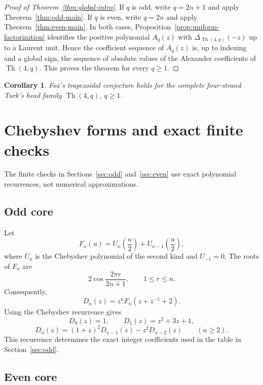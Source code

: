 \documentclass[11pt]{amsart}
\newtheorem{corollary}[theorem]{Corollary}
\newcommand{\Th}{\operatorname{Th}}
\begin{document}
\begin{proof}[Proof of Theorem~\ref{thm:global-intro}]
If \(q\) is odd, write \(q=2n+1\) and apply Theorem~\ref{thm:odd-main}.  If \(q\) is even, write \(q=2n\) and apply Theorem~\ref{thm:even-main}.  In both cases, Proposition~\ref{prop:uniform-factorization} identifies the positive polynomial \(A_q(z)\) with \(\Delta_{\Th(4,q)}(-z)\) up to a Laurent unit.  Hence the coefficient sequence of \(A_q(z)\) is, up to indexing and a global sign, the sequence of absolute values of the Alexander coefficients of \(\Th(4,q)\).  This proves the theorem for every \(q\ge1\).
\end{proof}

\begin{corollary}
Fox's trapezoidal conjecture holds for the complete four-strand Turk's head family \(\Th(4,q)\), \(q\ge1\).
\end{corollary}

\appendix

\section{Chebyshev forms and exact finite checks}\label{app:cheb}

The finite checks in Sections~\ref{sec:odd} and~\ref{sec:even} use exact polynomial recurrences, not numerical approximations.

\subsection{Odd core}

Let
\[
        F_n(u)=U_n\left(\frac u2\right)+U_{n-1}\left(\frac u2\right),
\]
where \(U_n\) is the Chebyshev polynomial of the second kind and \(U_{-1}=0\).  The roots of \(F_n\) are
\[
        2\cos\frac{2\pi r}{2n+1},
        \qquad 1\le r\le n.
\]
Consequently,
\[
        D_n(z)=z^n F_n\left(z+z^{-1}+2\right).
\]
Using the Chebyshev recurrence gives
\begin{equation}\label{eq:Dn-recurrence-app}
        D_0(z)=1,
        \qquad
        D_1(z)=z^2+3z+1,
\end{equation}
\begin{equation}\label{eq:Dn-recurrence-app2}
        D_n(z)=(1+z)^2D_{n-1}(z)-z^2D_{n-2}(z)
        \qquad(n\ge2).
\end{equation}
This recurrence determines the exact integer coefficients used in the table in Section~\ref{sec:odd}.

\subsection{Even core}
\end{document}
